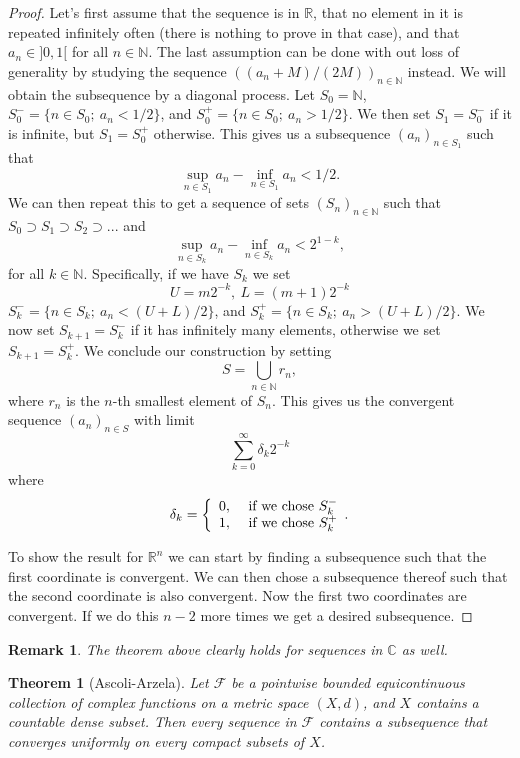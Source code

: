 \documentclass[a4paper,12pt,twoside,BCOR=10mm]{scrbook}
\newtheorem{theorem}{Theorem}
\newtheorem{remark}{Remark}
\begin{document}
\begin{proof}
Let's first assume that the sequence is in $\mathbb{R}$,
	that no element in it is repeated infinitely often (there is nothing to prove in that case),
	and that $a_n \in ]0, 1[$ for all $n \in \mathbb{N}$.
The last assumption can be done with out loss of generality by studying the sequence $((a_n + M)/(2M))_{n \in \mathbb{N}}$ instead.
We will obtain the subsequence by a diagonal process.
Let $S_0 = \mathbb{N}$, $S_0^- = \{n \in S_0;\ a_n < 1/2\}$, and $S_0^+ = \{n \in S_0;\ a_n > 1/2\}$.
We then set $S_1 = S_0^-$ if it is infinite, but $S_1 = S_0^+$ otherwise.
This gives us a subsequence $(a_n)_{n \in S_1}$ such that
\[
	\sup_{n \in S_1} a_n - \inf_{n \in S_1} a_n < 1/2.
\]
We can then repeat this to get a sequence of sets $(S_n)_{n \in \mathbb{N}}$ such that $S_0 \supset S_1 \supset S_2 \supset...$ and 
\[
	\sup_{n \in S_k} a_n - \inf_{n \in S_k} a_n < 2^{1 - k},
\]
for all $k \in \mathbb{N}$.
Specifically, if we have $S_k$ we set
\[
	U = m2^{-k},\ 
	L = (m + 1)2^{-k}
\]
$S_k^- = \{n \in S_k;\ a_n < (U + L)/2\}$, and $S_k^+ = \{n \in S_k;\ a_n > (U + L)/2\}$.
We now set $S_{k + 1} = S_k^-$ if it has infinitely many elements, otherwise we set $S_{k + 1} = S_k^+$.
We conclude our construction by setting
\[
	S = \bigcup_{n \in \mathbb{N}} r_n,
\]
where $r_n$ is the $n$-th smallest element of $S_n$.
This gives us the convergent sequence $(a_n)_{n \in S}$ with limit
\[
	\sum_{k = 0}^{\infty} \delta_k 2^{-k}
\]
where
\[
	\delta_k = \left \{
	\begin{array}{c c}
		0,\ & \text{if we chose } S_k^- \\
		1,\ & \text{if we chose } S_k^+
	\end{array}.
	\right .
\]

To show the result for $\mathbb{R}^n$ we can start by finding a subsequence such that the first coordinate is convergent.
We can then chose a subsequence thereof such that the second coordinate is also convergent.
Now the first two coordinates are convergent.
If we do this $n - 2$ more times we get a desired subsequence.
\end{proof}
\begin{remark}
The theorem above clearly holds for sequences in $\mathbb{C}$ as well.
\end{remark}
\begin{theorem}[Ascoli-Arzela]
Let $\mathcal{F}$ be a pointwise bounded equicontinuous collection of complex functions on a metric space $(X, d)$, and $X$ contains a countable dense subset.  %
Then every sequence in $\mathcal{F}$ contains a subsequence that converges uniformly on every compact subsets of $X$.
\end{theorem}
\end{document}
